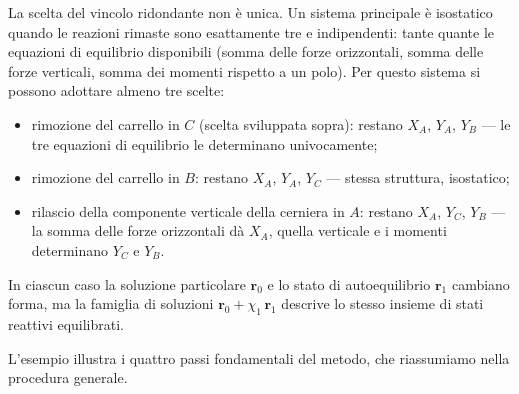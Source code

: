 \begin{esempio}
\begin{svolgimento}
		\begin{oss}
			La scelta del vincolo ridondante non è unica. Un sistema
			principale è isostatico quando le reazioni rimaste sono
			esattamente tre e indipendenti: tante quante le equazioni
			di equilibrio disponibili (somma delle forze orizzontali,
			somma delle forze verticali, somma dei momenti rispetto a
			un polo). Per questo sistema si possono adottare almeno
			tre scelte:
			\begin{itemize}[noitemsep]
				\item rimozione del carrello in $C$ (scelta sviluppata
				sopra): restano $X_A$, $Y_A$, $Y_B$ --- le tre equazioni
				di equilibrio le determinano univocamente;
				\item rimozione del carrello in $B$: restano $X_A$,
				$Y_A$, $Y_C$ --- stessa struttura, isostatico;
				\item rilascio della componente verticale della cerniera
				in $A$: restano $X_A$, $Y_C$, $Y_B$ --- la somma delle
				forze orizzontali dà $X_A$, quella verticale e i momenti
				determinano $Y_C$ e $Y_B$.
			\end{itemize}
			In ciascun caso la soluzione particolare $\bm{r}_0$ e lo
			stato di autoequilibrio $\bm{r}_1$ cambiano forma, ma la
			famiglia di soluzioni $\bm{r}_0 + \chi_1\,\bm{r}_1$ descrive
			lo stesso insieme di stati reattivi equilibrati.
		\end{oss}
	\end{svolgimento}
\end{esempio}

L'esempio illustra i quattro passi fondamentali del metodo,
che riassumiamo nella procedura generale.

